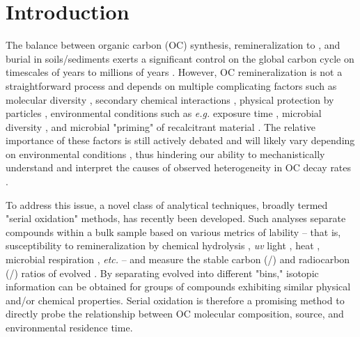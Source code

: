 \section{Introduction}

The balance between organic carbon (OC) synthesis, remineralization to , and burial in soils/sediments exerts a significant control on the global carbon cycle on timescales of years to millions of years \citep[\textit{e.g.}][]{Lasaga:1985ts,Derry:1996um,Hayes:2006ca,Galy:2008ff}. However, OC remineralization is not a straightforward process and depends on multiple complicating factors such as molecular diversity \citep{Kellerman:2015jn}, secondary chemical interactions \citep{Hedges:2000vh,Schmidt:2011gg}, physical protection by particles \citep{Mayer:1994wn,Mikutta:2006gx}, environmental conditions such as \textit{e.g.}  exposure time \citep{Hartnett:1998id}, microbial diversity \citep{Kramer:2008dd,Janssens:2010hd,Schmidt:2011gg}, and microbial "priming" of recalcitrant material \citep{Bianchi:2011cu}. The relative importance of these factors is still actively debated and will likely vary depending on environmental conditions \citep[\textit{e.g.}][]{Hedges:2001ve,Rothman:2007jq,Schmidt:2011gg,Kellerman:2015jn}, thus hindering our ability to mechanistically understand and interpret the causes of observed heterogeneity in OC decay rates \citep{Boudreau:1991wf}.

To address this issue, a novel class of analytical techniques, broadly termed "serial oxidation" methods, has recently been developed. Such analyses separate compounds within a bulk sample based on various metrics of lability -- that is, susceptibility to remineralization by chemical hydrolysis \citep{Helfrich:2007ej}, \textit{uv} light \citep{Follett:2014if}, heat \citep{Szidat:2004kx,Currie:2005wo,Rosenheim:2008ed}, microbial respiration \citep{Beaupre:2016km}, \textit{etc.} -- and measure the stable carbon (/) and radiocarbon (/) ratios of evolved . By separating evolved  into different "bins," isotopic information can be obtained for groups of compounds exhibiting similar physical and/or chemical properties. Serial oxidation is therefore a promising method to directly probe the relationship between OC molecular composition, source, and environmental residence time.

